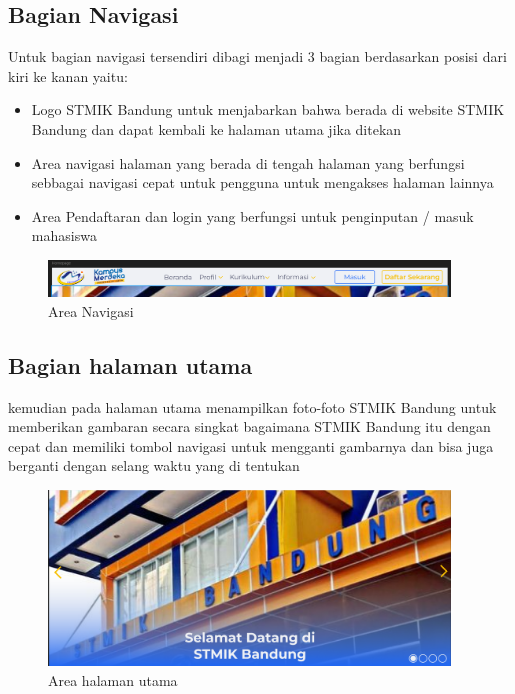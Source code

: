 \documentclass[a4paper, 12pt]{article}
\begin{document}
\subsection{Bagian Navigasi}
Untuk bagian navigasi tersendiri dibagi menjadi 3 bagian berdasarkan posisi dari kiri ke kanan yaitu:
\begin{itemize}
  \item Logo STMIK Bandung untuk menjabarkan bahwa berada di website STMIK Bandung dan dapat kembali ke halaman utama jika ditekan
  \item Area navigasi halaman yang berada di tengah halaman yang berfungsi sebbagai navigasi cepat untuk pengguna untuk mengakses halaman lainnya 
  \item Area Pendaftaran dan login yang berfungsi untuk penginputan / masuk mahasiswa
\end{itemize}
\begin{figure}[H]
  \begin{center}
    \includegraphics[width=0.95\textwidth]{images/gambar2.png}
  \end{center}
  \caption{Area Navigasi}\label{fig:navi}
\end{figure}

\subsection{Bagian halaman utama}
kemudian pada halaman utama menampilkan foto-foto STMIK Bandung untuk memberikan gambaran secara singkat bagaimana STMIK Bandung itu dengan cepat dan memiliki tombol navigasi untuk mengganti gambarnya dan bisa juga berganti dengan selang waktu yang di tentukan
\begin{figure}[H]
  \begin{center}
    \includegraphics[width=0.95\textwidth]{images/gambar3.png}
  \end{center}
  \caption{Area halaman utama}\label{fig:}
\end{figure}
\end{document}

